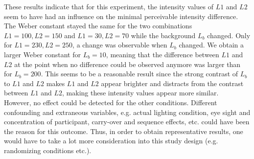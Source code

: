\documentclass{article}
\begin{document}
These results indicate that for this experiment, the intensity values of $L1$ and $L2$ seem to have had an influence on the minimal perceivable intensity difference. The Weber constant stayed the same for the two combinations $L1=100, L2=150$ and $L1=30, L2=70$ while the background $L_b$ changed. Only for $L1=230, L2=250$, a change was observable when $L_b$ changed. We obtain a larger Weber constant for $L_b = 10$, meaning that the difference between $L1$ and $L2$ at the point when no difference could be observed anymore was larger than for $L_b=200$. This seems to be a reasonable result since the strong contrast of $L_b$ to $L1$ and $L2$ makes $L1$ and $L2$ appear brighter and distracts from the contrast between $L1$ and $L2$, making these intensity values appear more similar. \\
However, no effect could be detected for the other conditions. Different confounding and extraneous variables, e.g. actual lighting condition, eye sight and concentration of participant, carry-over and sequence effects, etc. could have been the reason for this outcome. Thus, in order to obtain representative results, one would have to take a lot more consideration into this study design (e.g. randomizing conditions etc.).
\end{document}
